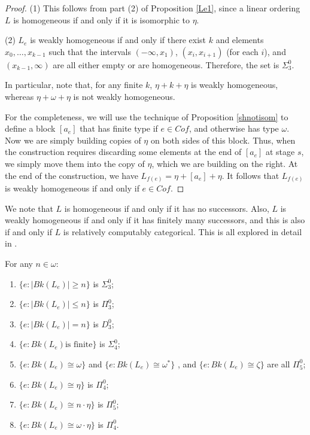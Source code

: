 \documentclass[11pt]{amsart}
\theoremstyle{definition}
\begin{document}
\begin{proof} (1) This follows from part (2) of Proposition \ref{Le1}, since a linear ordering $L$ is homogeneous if and only if it is isomorphic to $\eta$.

(2) $L_e$ is weakly homogeneous if and only if there exist $k$ and elements $x_0,\dots,x_{k-1}$ such that the intervals $(-\infty, x_1)$, $(x_i,x_{i+1})$ (for each $i$), and $(x_{k-1},\infty)$ are all either empty or are homogeneous. Therefore, the set is $\Sigma^0_3$.

In particular, note that, for any finite $k$, $\eta + k + \eta$ is weakly homogeneous, whereas $\eta + \omega + \eta$ is not weakly homogeneous. 

For the completeness, we will use the technique of Proposition \ref{shnotisom} to define a block $[a_e]$ that has finite type if $e \in Cof$, and otherwise has type $\omega$. Now we are simply building copies of $\eta$ on both sides of this block. Thus, when the construction requires discarding some elements at the end of $[a_e]$ at stage $s$, we simply move them into the copy of $\eta$, which we are building on the right. At the end of the construction, we have $L_{f(e)} = \eta + [a_e] + \eta$. It follows that $L_{f(e)}$ is weakly homogeneous if and only if $e \in Cof$. 
\end{proof} 

We note that $L$ is homogeneous if and only if it has no successors.
Also, $L$ is weakly homogeneous if and only if it has finitely many successors, and this is also if and only if $L$ is relatively computably categorical.
This is all explored in detail in \cite{AC17}.

\begin{proposition} For any $n \in \omega$: 
\begin{enumerate}
\item $\{e: |Bk(L_e)| \geq n\}$ is $\Sigma^0_3$;
\item $\{e: |Bk(L_e)| \leq n\}$ is $\Pi^0_3$; 
\item $\{e: |Bk(L_e)| = n\}$ is $D^0_3$; 
    \item $\{e: Bk(L_e) \text{is finite}\}$ is $\Sigma^0_4$; 
    \item $\{e: Bk(L_e) \cong \omega\}$ and $\{e: Bk(L_e) \cong \omega^*\}$ , and $\{e: Bk(L_e) \cong \zeta\}$ are all $\Pi^0_5$;
    \item $\{e: Bk(L_e) \cong \eta\}$ is $\Pi^0_4$; 
    \item $\{e: Bk(L_e) \cong n \cdot \eta\}$ is $\Pi^0_5$; 
    \item $\{e: Bk(L_e) \cong \omega \cdot \eta\}$ is $\Pi^0_4$. 
\end{enumerate}
\end{proposition}
\end{document}
